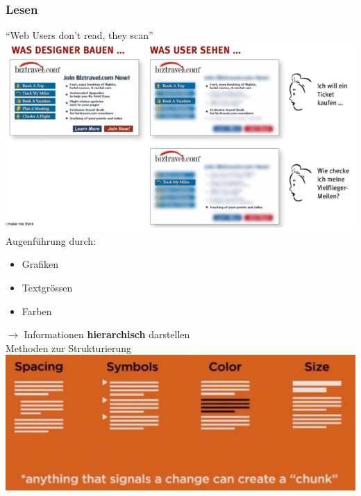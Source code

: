 \documentclass[a4paper, landscape, 8pt]{scrartcl}
\begin{document}
\begin{multicols*}{4}
        \subsubsection{Lesen}
        \enquote{Web Users don't read, they scan} \\
        \includegraphics[scale=0.3]{graphic/10-users-read} \\
        Augenführung durch:
        \begin{itemize}
            \item Grafiken
            \item Textgrössen
            \item Farben
        \end{itemize}

        $\to$ Informationen \textbf{\textcolor{subsectioncolor}{hierarchisch}} darstellen \\
        Methoden zur Strukturierung \\
        \includegraphics[scale=0.2]{graphic/12-strukturierung}


\end{multicols*}
\end{document}
